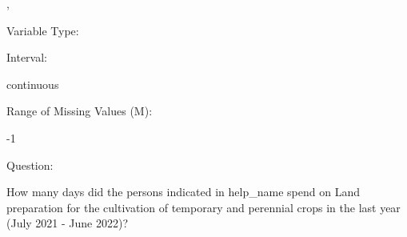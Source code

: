 \documentclass[
]{article}
\begin{document}
,

\begin{minipage}[t]{0.3\linewidth}

\colorbox{mypink1}{}

\end{minipage}%
\begin{minipage}[t]{0.7\linewidth}

\colorbox{mypink1}{\makebox[\textwidth]{\strut\bfseries\color{black}  
 }}

\end{minipage}

\begin{minipage}[t]{0.3\linewidth}

Variable Type:

\end{minipage}%
\begin{minipage}[t]{0.7\linewidth}

\end{minipage}

\begin{minipage}[t]{0.3\linewidth}

Interval:

\end{minipage}%
\begin{minipage}[t]{0.7\linewidth}

continuous

\end{minipage}

\begin{minipage}[t]{0.3\linewidth}

Range of Missing Values (M):

\end{minipage}%
\begin{minipage}[t]{0.7\linewidth}

-1

\end{minipage}

\begin{minipage}[t]{0.3\linewidth}

Question:

\end{minipage}%
\begin{minipage}[t]{0.7\linewidth}

How many days did the persons indicated in help\_name spend on Land
preparation for the cultivation of temporary and perennial crops in the
last year (July 2021 - June 2022)?

\end{minipage}
\end{document}
